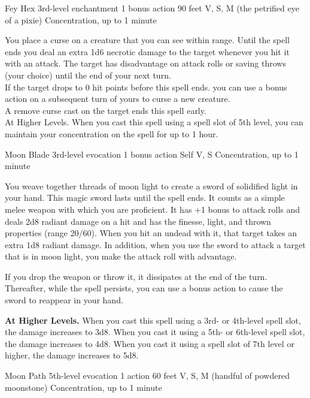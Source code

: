 \documentclass[letter,10pt,twocolumn,openany]{dndbook}
\begin{document}

\DndSpellHeader
  {Fey Hex}
  {3rd-level enchantment}
  {1 bonus action}
  {90 feet}
  {V, S, M (the petrified eye of a pixie)}
  {Concentration, up to 1 minute}

You place a curse on a creature that you can see within range. Until the spell ends you deal an extra 1d6 necrotic damage to the target whenever you hit it with an attack. The target has disadvantage on attack rolls or saving throws (your choice) until the end of your next turn.\\
If the target drops to 0 hit points before this spell ends. you can use a bonus action on a subsequent turn of yours to curse a new creature.\\
A remove curse cast on the target ends this spell early.\\
At Higher Levels. When you cast this spell using a spell slot of 5th level, you can maintain your concentration on the spell for up to 1 hour.

\DndSpellHeader
  {Moon Blade}
  {3rd-level evocation}
  {1 bonus action}
  {Self}
  {V, S}
  {Concentration, up to 1 minute}

You weave together threads of moon light to create a sword of solidified light in your hand. This magic sword lasts until the spell ends. It counts as a simple melee weapon with which you are proficient. It has +1 bonus to attack rolls and deals 2d8 radiant damage on a hit and has the finesse, light, and thrown properties (range 20/60). When you hit an undead with it, that target takes an extra 1d8 radiant damage. In addition, when you use the sword to attack a target that is in moon light, you make the attack roll with advantage.

If you drop the weapon or throw it, it dissipates at the end of the turn. Thereafter, while the spell persists, you can use a bonus action to cause the sword to reappear in your hand.

\textbf{At Higher Levels.} When you cast this spell using a 3rd- or 4th-level spell slot, the damage increases to 3d8. When you cast it using a 5th- or 6th-level spell slot, the damage increases to 4d8. When you cast it using a spell slot of 7th level or higher, the damage increases to 5d8.

\DndSpellHeader
  {Moon Path}
  {5th-level evocation}
  {1 action}
  {60 feet}
  {V, S, M (handful of powdered moonstone)}
  {Concentration, up to 1 minute}
\end{document}
